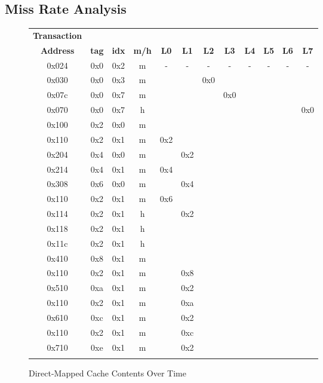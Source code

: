 \documentclass[10pt]{article}
\begin{document}
\subsection{Miss Rate Analysis}
\begin{figure}[H]
\centering
\begin{tabular}{@{\extracolsep{3pt}}cccccccccccc@{}}
\Xhline{2\arrayrulewidth}
\textbf{Transaction} & & & & & & & & & & & & \\
\textbf{Address} & \textbf{tag} & \textbf{idx} & \textbf{m/h} & \textbf{L0} & \textbf{L1} & \textbf{L2} & \textbf{L3} & \textbf{L4} & \textbf{L5} & \textbf{L6} & \textbf{L7}\\
\Xhline{2\arrayrulewidth}
0x024 & 0x0 & 0x2 & m &  -  &  -  &  -  &  -  &  -  &  -  &  -  &  -  \\
0x030 & 0x0 & 0x3 & m &     &     & 0x0 &     &     &     &     &     \\
0x07c & 0x0 & 0x7 & m &     &     &     & 0x0 &     &     &     &     \\
0x070 & 0x0 & 0x7 & h &     &     &     &     &     &     &     & 0x0 \\
0x100 & 0x2 & 0x0 & m &     &     &     &     &     &     &     &     \\
0x110 & 0x2 & 0x1 & m & 0x2 &     &     &     &     &     &     &     \\
0x204 & 0x4 & 0x0 & m &     & 0x2 &     &     &     &     &     &     \\
0x214 & 0x4 & 0x1 & m & 0x4 &     &     &     &     &     &     &     \\
0x308 & 0x6 & 0x0 & m &     & 0x4 &     &     &     &     &     &     \\
0x110 & 0x2 & 0x1 & m & 0x6 &     &     &     &     &     &     &     \\
0x114 & 0x2 & 0x1 & h &     & 0x2 &     &     &     &     &     &     \\
0x118 & 0x2 & 0x1 & h &     &     &     &     &     &     &     &     \\
0x11c & 0x2 & 0x1 & h &     &     &     &     &     &     &     &     \\
0x410 & 0x8 & 0x1 & m &     &     &     &     &     &     &     &     \\
0x110 & 0x2 & 0x1 & m &     & 0x8 &     &     &     &     &     &     \\
0x510 & 0xa & 0x1 & m &     & 0x2 &     &     &     &     &     &     \\
0x110 & 0x2 & 0x1 & m &     & 0xa &     &     &     &     &     &     \\
0x610 & 0xc & 0x1 & m &     & 0x2 &     &     &     &     &     &     \\
0x110 & 0x2 & 0x1 & m &     & 0xc &     &     &     &     &     &     \\
0x710 & 0xe & 0x1 & m &     & 0x2 &     &     &     &     &     &     \\
\Xhline{2\arrayrulewidth}
\multicolumn{12}{l}{\textbf{Number of Misses = 16}}
\hline
\multicolumn{12}{l}{\textbf{Miss Rate = 0.8}}
\Xhline{2\arrayrulewidth}
\end{tabular}
\caption{Direct-Mapped Cache Contents Over Time}
\end{figure}
\end{document}
